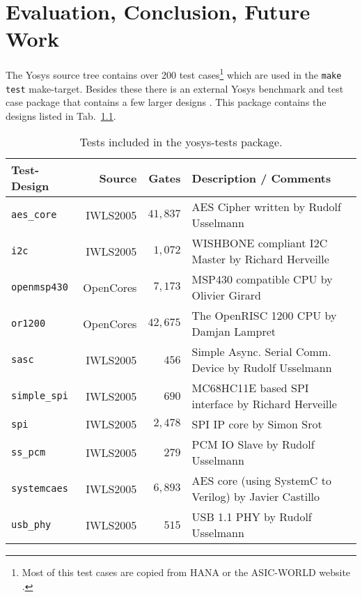 
\chapter{Evaluation, Conclusion, Future Work}
\label{chapter:eval}

The Yosys source tree contains over 200 test cases\footnote{Most of this test
cases are copied from HANA  or the ASIC-WORLD website
.} which are used in the {\tt make test} make-target.
Besides these there is an external Yosys benchmark and test case package that
contains a few larger designs . This package
contains the designs listed in Tab.~\ref{tab:yosys-test-designs}.

\begin{table}
	\hfil
	\begin{tabular}{lrrp{8.5cm}}
		Test-Design & Source & Gates\footnotemark & Description / Comments \\
		\hline
		{\tt aes\_core}   &  IWLS2005 & $ 41{,}837 $ & \footnotesize AES Cipher written by Rudolf Usselmann \\
		{\tt i2c}         &  IWLS2005 & $  1{,}072 $ & \footnotesize WISHBONE compliant I2C Master by Richard Herveille \\
		{\tt openmsp430}  & OpenCores & $  7{,}173 $ & \footnotesize MSP430 compatible CPU by Olivier Girard \\
		{\tt or1200}      & OpenCores & $ 42{,}675 $ & \footnotesize The OpenRISC 1200 CPU by Damjan Lampret \\
		{\tt sasc}        &  IWLS2005 & $      456 $ & \footnotesize Simple Async. Serial Comm. Device by Rudolf Usselmann \\
		{\tt simple\_spi} &  IWLS2005 & $      690 $ & \footnotesize MC68HC11E based SPI interface by Richard Herveille \\
		{\tt spi}         &  IWLS2005 & $  2{,}478 $ & \footnotesize SPI IP core by Simon Srot \\
		{\tt ss\_pcm}     &  IWLS2005 & $      279 $ & \footnotesize PCM IO Slave by Rudolf Usselmann \\
		{\tt systemcaes}  &  IWLS2005 & $  6{,}893 $ & \footnotesize AES core (using SystemC to Verilog) by Javier Castillo \\
		{\tt usb\_phy}    &  IWLS2005 & $      515 $ & \footnotesize USB 1.1 PHY by Rudolf Usselmann \\
	\end{tabular}
	\caption{Tests included in the yosys-tests package.}
	\label{tab:yosys-test-designs}
\end{table}

